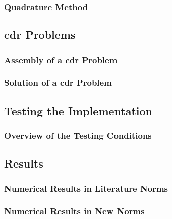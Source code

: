 \begin{frame}
    \frametitle{Quadrature Method}

    
\end{frame}

\subsection{\texorpdfstring{\acrshort{cdr}}{} Problems}

\begin{frame}
    \frametitle{Assembly of a \acrshort{cdr} Problem}

    
\end{frame}

\begin{frame}
    \frametitle{Solution of a \acrshort{cdr} Problem}

    
\end{frame}

\subsection{Testing the Implementation}

\begin{frame}
    \frametitle{Overview of the Testing Conditions}

    
\end{frame}

\subsection{Results}

\begin{frame}
    \frametitle{Numerical Results in Literature Norms}

    
\end{frame}

\begin{frame}
    \frametitle{Numerical Results in New Norms}

    
\end{frame}